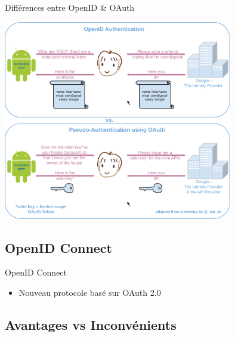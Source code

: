 \documentclass{beamer}
\begin{document}
\begin{frame}{Différences entre OpenID \& OAuth}
  \begin{center}
    \includegraphics[width=0.75\textwidth]{img/OpenIDvsPseudo-AuthenticationusingOAuth}
  \end{center}
\end{frame}

\subsection{OpenID Connect}

\begin{frame}{OpenID Connect}
  \begin{center}
    \begin{itemize}
    \item Nouveau protocole basé sur OAuth 2.0
    \end{itemize}
  \end{center}
\end{frame}

\subsection{Avantages vs Inconvénients}
\end{document}
